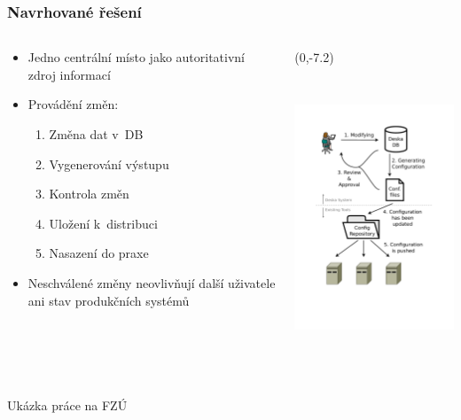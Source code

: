 \documentclass{beamer}
\begin{document}
\begin{frame}[fragile]
\frametitle{Navrhované řešení}
\begin{columns}
\begin{column}{.45\paperwidth}
    \begin{itemize}
        \item Jedno centrální místo jako autoritativní zdroj informací
        \item Provádění změn:
            \begin{enumerate}
                \item Změna dat v~DB
                \item Vygenerování výstupu
                \item Kontrola změn
                \item Uložení k~distribuci
                \item Nasazení do praxe
            \end{enumerate}
        \item Neschválené změny neovlivňují další uživatele ani stav produkčních systémů
    \end{itemize}
\end{column}
\begin{column}{.55\paperwidth}
\begin{textblock}{50}(0,-7.2)
\includegraphics[height=90mm, trim=28mm 53mm 30mm 28mm, clip=true]{../../technical/img-deska-workflow.pdf}
\end{textblock}
\end{column}
\end{columns}
\end{frame}


\begin{frame}[fragile]
\begin{center}
Ukázka práce na FZÚ
\end{center}
\end{frame}
\end{document}
